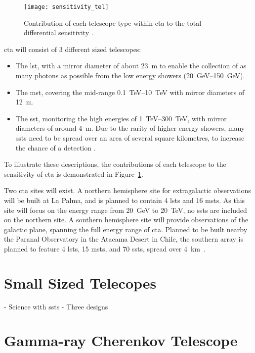 \begin{figure}
	\centering\texttt{[image: sensitivity\_tel]} 
	\caption[Differential sensitivity of the different CTA telescope types.]{Contribution of each telescope type within \gls{cta} to the total differential sensitivity \cite{Marano2014}.}
	\label{fig:sensitivity_tel}
\end{figure}

\gls{cta} will consist of 3 different sized telescopes:
\begin{itemize}
\item The \gls{lst}, with a mirror diameter of about \SI{23}{m} to enable the collection of as many photons as possible from the low energy showers (\SIrange{20}{150}{GeV}).
\item The \gls{mst}, covering the mid-range \SIrange{0.1}{10}{TeV} with mirror diameters of \SI{12}{m}.
\item The \gls{sst}, monitoring the high energies of \SIrange{1}{300}{TeV}, with mirror diameters of around \SI{4}{m}. Due to the rarity of higher energy showers, many \glspl{sst} need to be spread over an area of several square kilometres, to increase the chance of a detection \cite{Acharya2013}.
\end{itemize}
To illustrate these descriptions, the contributions of each telescope to the sensitivity of \gls{cta} is demonstrated in Figure~\ref{fig:sensitivity_tel}.

Two \gls{cta} sites will exist. A northern hemisphere site for extragalactic observations will be built at La Palma, and is planned to contain 4 \glspl{lst} and 16 \glspl{mst}. As this site will focus on the energy range from \SI{20}{GeV} to \SI{20}{TeV}, no \glspl{sst} are included on the northern site. A southern hemisphere site will provide observations of the galactic plane, spanning the full energy range of \gls{cta}. Planned to be built nearby the Paranal Observatory in the Atacama Desert in Chile, the southern array is planned to feature 4 \glspl{lst}, 15 \glspl{mst}, and 70 \glspl{sst}, spread over \SI{4}{km \squared}.

\section{Small Sized Telecopes}

- Science with ssts
- Three designs

\section{Gamma-ray Cherenkov Telescope}

